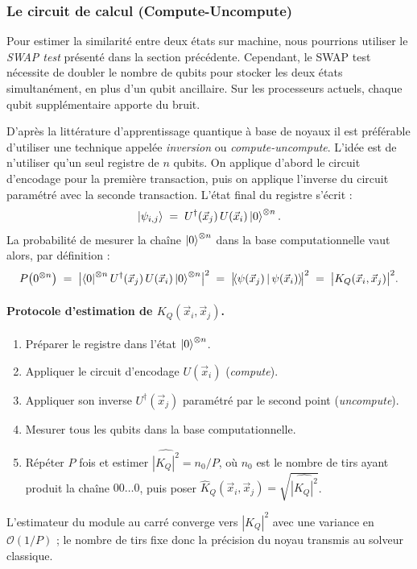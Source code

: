 \documentclass[a4paper]{article}
\begin{document}
\subsubsection*{Le circuit de calcul (Compute-Uncompute)}

Pour estimer la similarité entre deux états sur machine, nous pourrions utiliser le \emph{SWAP test} présenté dans la section précédente. Cependant, le SWAP test nécessite de doubler le nombre de qubits pour stocker les deux états simultanément, en plus d'un qubit ancillaire. Sur les processeurs actuels, chaque qubit supplémentaire apporte du bruit.

D'après la littérature d'apprentissage quantique à base de noyaux \cite{schuld2019qml} il est préférable d'utiliser une technique appelée \emph{inversion} ou \emph{compute-uncompute}. L'idée est de n'utiliser qu'un seul registre de $n$ qubits. On applique d'abord le circuit d'encodage pour la première transaction, puis on applique l'inverse du circuit paramétré avec la seconde transaction. L'état final du registre s'écrit :
\[
\ket{\psi_{i,j}} \;=\; U^\dagger(\vec{x}_j) \, U(\vec{x}_i)\ket{0}^{\otimes n}.
\]
La probabilité de mesurer la chaîne $\ket{0}^{\otimes n}$ dans la base computationnelle vaut alors, par définition :
\[
P\!\left(0^{\otimes n}\right) \;=\; \bigl|\bra{0}^{\otimes n} U^\dagger(\vec{x}_j)\, U(\vec{x}_i) \ket{0}^{\otimes n}\bigr|^2 \;=\; \bigl|\!\braket{\psi(\vec{x}_j)\,|\,\psi(\vec{x}_i)}\!\bigr|^2 \;=\; \bigl|K_Q(\vec{x}_i, \vec{x}_j)\bigr|^2.
\]
\paragraph{Protocole d'estimation de $K_Q(\vec{x}_i,\vec{x}_j)$.}
\begin{enumerate}
    \item Préparer le registre dans l'état $\ket{0}^{\otimes n}$.
    \item Appliquer le circuit d'encodage $U(\vec{x}_i)$ (\emph{compute}).
    \item Appliquer son inverse $U^\dagger(\vec{x}_j)$ paramétré par le second point (\emph{uncompute}).
    \item Mesurer tous les qubits dans la base computationnelle.
    \item Répéter $P$ fois et estimer $\widehat{|K_Q|^2} = n_0 / P$, où $n_0$ est le nombre de tirs ayant produit la chaîne $00\dots0$, puis poser $\widehat{K}_Q(\vec{x}_i, \vec{x}_j) = \sqrt{\widehat{|K_Q|^2}}$.
\end{enumerate}
L'estimateur du module au carré converge vers $|K_Q|^2$ avec une variance en $\mathcal{O}(1/P)$ ; le nombre de tirs fixe donc la précision du noyau transmis au solveur classique.
\end{document}
